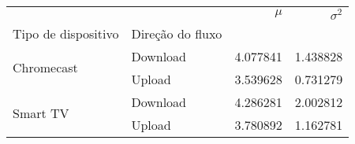 \begin{tabular}{llrr}
\toprule
 &  & $\mu$ & $\sigma^2$ \\
Tipo de dispositivo & Direção do fluxo &  &  \\
\midrule
\multirow[t]{2}{*}{Chromecast} & Download & 4.077841 & 1.438828 \\
 & Upload & 3.539628 & 0.731279 \\
\cline{1-4}
\multirow[t]{2}{*}{Smart TV} & Download & 4.286281 & 2.002812 \\
 & Upload & 3.780892 & 1.162781 \\
\cline{1-4}
\bottomrule
\end{tabular}
